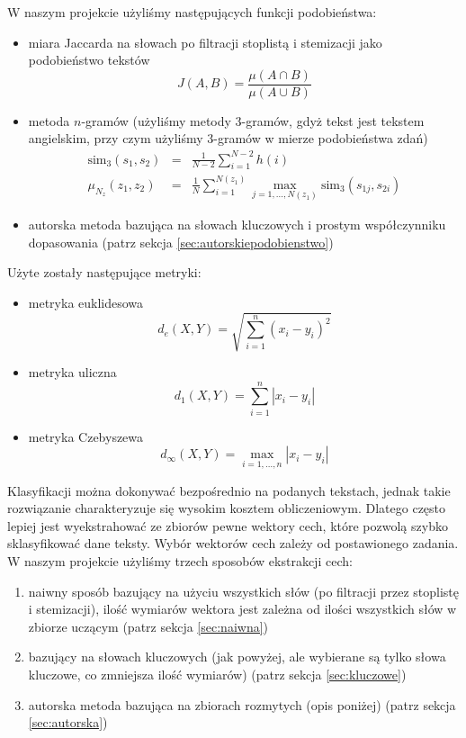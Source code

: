\documentclass[a4paper]{classrep}
\begin{document}
W naszym projekcie użyliśmy następujących funkcji podobieństwa:
\begin{itemize}
\item miara Jaccarda na słowach po filtracji stoplistą i stemizacji jako podobieństwo tekstów
\begin{equation}
\label{eq:jaccard}
J(A,B) = \frac{\mu(A\cap B)}{\mu(A \cup B)}
\end{equation}
\item metoda \(n\)-gramów (użyliśmy metody 3-gramów, gdyż tekst jest tekstem angielskim, przy czym użyliśmy 3-gramów w mierze podobieństwa zdań)
\begin{eqnarray}
\textrm{sim}_3(s_1,s_2) & = & \frac{1}{N-2}\sum_{i=1}^{N-2}h(i) \\
\label{eq:ngram}
\mu_{N_z}(z_1, z_2) & = & \frac{1}{N} \sum_{i=1}^{N(z_1)}\max_{j=1,\ldots,N(z_1)} \textrm{sim}_3(s_{1j}, s_{2i})
\end{eqnarray}
\item autorska metoda bazująca na słowach kluczowych i prostym współczynniku dopasowania (patrz sekcja \ref{sec:autorskiepodobienstwo})
\end{itemize}
Użyte zostały następujące metryki:
\begin{itemize}
\item metryka euklidesowa
\begin{equation}
\label{eq:euklides}
d_e(X,Y)=\sqrt{\sum_{i=1}^n(x_i-y_i)^2}
\end{equation}
\item metryka uliczna
\begin{equation}
\label{eq:uliczna}
d_1(X,Y)=\sum_{i=1}^n|x_i-y_i|
\end{equation}
\item metryka Czebyszewa
\begin{equation}
\label{eq:czebyszew}
d_\infty(X,Y)=\max_{i=1,\ldots,n}|x_i-y_i|
\end{equation}
\end{itemize}

Klasyfikacji można dokonywać bezpośrednio na podanych tekstach, jednak takie rozwiązanie charakteryzuje się wysokim kosztem obliczeniowym. Dlatego często lepiej jest
wyekstrahować ze zbiorów pewne wektory cech, które pozwolą szybko sklasyfikować dane teksty. Wybór wektorów cech zależy od postawionego zadania.
W naszym projekcie użyliśmy trzech sposobów ekstrakcji cech:
\begin{enumerate}
\item naiwny sposób bazujący na użyciu wszystkich słów (po filtracji przez stoplistę i stemizacji), ilość wymiarów wektora jest zależna od ilości wszystkich słów w zbiorze uczącym (patrz sekcja \ref{sec:naiwna})
\item bazujący na słowach kluczowych (jak powyżej, ale wybierane są tylko słowa kluczowe, co zmniejsza ilość wymiarów) (patrz sekcja \ref{sec:kluczowe})
\item autorska metoda bazująca na zbiorach rozmytych (opis poniżej) (patrz sekcja \ref{sec:autorska})
\end{enumerate}
\end{document}
